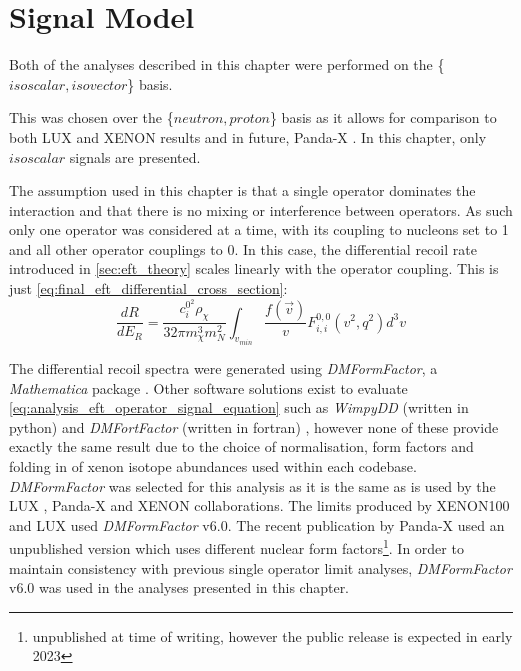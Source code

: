 \section{Signal Model}
\label{sec:eft_signal_models}
\par
Both of the analyses described in this chapter were performed on the \{$isoscalar,isovector$\} basis.

This was chosen over the \{$neutron,proton$\} basis as it allows for comparison to both LUX \cite{LUX_RUN4_EFT_2021} and XENON \cite{xenon100_eft_ref} results and in future, Panda-X \cite{pandax_2_eft_ref}.
In this chapter, only $isoscalar$ signals are presented.

\par
The assumption used in this chapter is that a single operator dominates the interaction and that there is no mixing or interference between operators.
As such only one operator was considered at a time, with its coupling to nucleons set to 1 and all other operator couplings to 0.
In this case, the differential recoil rate introduced in \autoref{sec:eft_theory} scales linearly with the operator coupling.
This is just \autoref{eq:final_eft_differential_cross_section}:
\begin{equation}
    \frac{dR}{dE_R} = \frac{c^{0^2}_i \rho_\chi}{32 \pi m^3_\chi m^2_N} \int_{v_{min}} \frac{f(\vec{v})}{v} F^{0,0}_{i,i} (v^2, q^2) d^3 v
    \label{eq:analysis_eft_operator_signal_equation}
\end{equation} 

\par
The differential recoil spectra were generated using \textit{DMFormFactor}, a \textit{Mathematica} package \cite{dmformfactor_ref}.
Other software solutions exist to evaluate \autoref{eq:analysis_eft_operator_signal_equation} such as \textit{WimpyDD} (written in python) \cite{wimpydd_ref} and \textit{DMFortFactor} (written in fortran) \cite{dmfortfactor_ref}, however none of these provide exactly the same result due to the choice of normalisation, form factors and folding in of xenon isotope abundances used within each codebase.
\textit{DMFormFactor} was selected for this analysis as it is the same as is used by the LUX \cite{LUX_RUN4_EFT_2021}, Panda-X \cite{pandax_2_eft_ref} and XENON \cite{xenon100_eft_ref} collaborations.
The limits produced by XENON100 and LUX used \textit{DMFormFactor} v6.0.
The recent publication by Panda-X used an unpublished version which uses different nuclear form factors\footnote{unpublished at time of writing, however the public release is expected in early 2023}.
In order to maintain consistency with previous single operator limit analyses, \textit{DMFormFactor} v6.0 was used in the analyses presented in this chapter.

